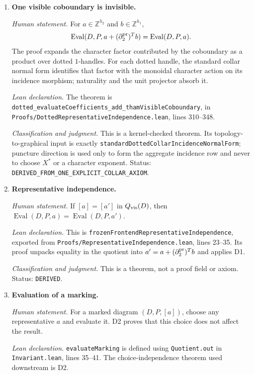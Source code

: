 \begin{enumerate}[label=\textbf{D\arabic*.},leftmargin=*]

\item \textbf{One visible coboundary is invisible.}

\emph{Human statement.}
For $a\in\mathbb Z^{h_2}$ and
$b\in\mathbb Z^{h_1}$,
\[
 \operatorname{Eval}(D,P,a+(\partial_2^{\rm pr})^Tb)
 =\operatorname{Eval}(D,P,a).
\]
The proof expands the character factor contributed by the coboundary as a
product over dotted $1$-handles.  For each dotted handle, the standard collar
normal form identifies that factor with the monoidal character action on its
incidence morphism; naturality and the unit projector absorb it.

\emph{Lean declaration.}
The theorem is
\nolinkurl{dotted_evaluateCoefficients_add_thamVisibleCoboundary}, in
\nolinkurl{Proofs/DottedRepresentativeIndependence.lean}, lines 310--348.

\emph{Classification and judgment.}
This is a kernel-checked theorem.  Its topology-to-graphical input is exactly
\nolinkurl{standardDottedCollarIncidenceNormalForm}; puncture direction is used
only to form the aggregate incidence row and never to choose $X^*$ or a
character exponent.  Status: \nolinkurl{DERIVED_FROM_ONE_EXPLICIT_COLLAR_AXIOM}.

\item \textbf{Representative independence.}

\emph{Human statement.}
If $[a]=[a']$ in $Q_{\rm vis}(D)$, then
$\operatorname{Eval}(D,P,a)=\operatorname{Eval}(D,P,a')$.

\emph{Lean declaration.}
This is \nolinkurl{frozenFrontendRepresentativeIndependence}, exported from
\nolinkurl{Proofs/RepresentativeIndependence.lean}, lines 23--35.  Its proof
unpacks equality in the quotient into $a'=a+(\partial_2^{\rm pr})^Tb$ and
applies D1.

\emph{Classification and judgment.}
This is a theorem, not a proof field or axiom.  Status: \texttt{DERIVED}.

\item \textbf{Evaluation of a marking.}

\emph{Human statement.}
For a marked diagram $(D,P,[a])$, choose any representative $a$ and evaluate
it.  D2 proves that this choice does not affect the result.

\emph{Lean declaration.}
\texttt{evaluateMarking} is defined using \texttt{Quotient.out} in
\nolinkurl{Invariant.lean}, lines 35--41.  The choice-independence theorem used
downstream is D2.


\end{enumerate}
